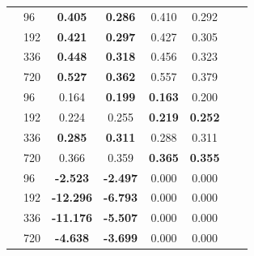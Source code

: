 \begin{table}[ht!]
\begin{center}
\begin{tabular}{ll | cccccc}
\parbox[t]{1mm}{}
									& 96  & \textbf{0.405} & \textbf{0.286}    & 0.410          & 0.292        \\
									& 192 & \textbf{0.421} & \textbf{0.297}    & 0.427          & 0.305        \\
									& 336 & \textbf{0.448} & \textbf{0.318}    & 0.456          & 0.323        \\
									& 720 & \textbf{0.527} & \textbf{0.362}    & 0.557          & 0.379        \\ \midrule
\parbox[t]{1mm}{}
									& 96  & 0.164          & \textbf{0.199}    & \textbf{0.163} & 0.200           \\
									& 192 & 0.224          & 0.255             & \textbf{0.219} & \textbf{0.252}  \\
									& 336 & \textbf{0.285} & \textbf{0.311}    & 0.288          & 0.311           \\
									& 720 & 0.366          & 0.359             & \textbf{0.365} & \textbf{0.355}  \\ \midrule \midrule
\parbox[t]{1mm}{}
									& 96  & \textbf{-2.523}  & \textbf{-2.497} & 0.000          & 0.000        \\
									& 192 & \textbf{-12.296} & \textbf{-6.793} & 0.000          & 0.000        \\
									& 336 & \textbf{-11.176} & \textbf{-5.507} & 0.000          & 0.000        \\
									& 720 & \textbf{-4.638}  & \textbf{-3.699} & 0.000          & 0.000        \\ \bottomrule
	\end{tabular}
	\end{center}
\end{table}